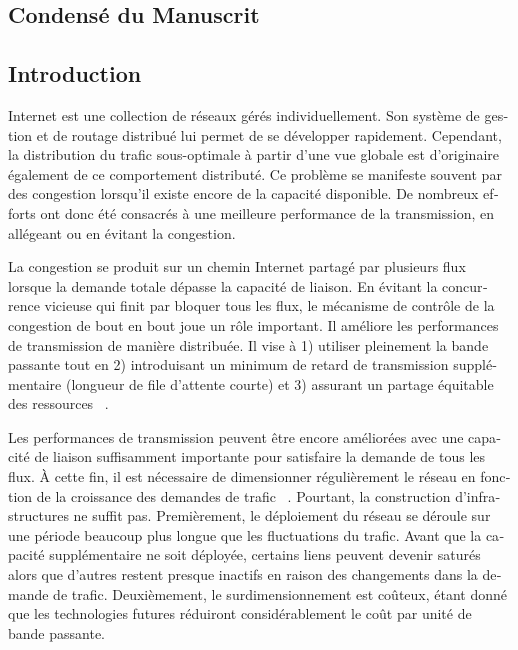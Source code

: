 \begin{otherlanguage}{french}
\chapter*{Condensé du Manuscrit}
\section*{Introduction}
Internet est une collection de réseaux gérés individuellement.
Son système de gestion et de routage distribué lui permet de se développer rapidement.
Cependant, la distribution du trafic sous-optimale à partir d'une vue globale est d'originaire également de ce comportement distributé.
Ce problème se manifeste souvent par des congestion lorsqu'il existe encore de la capacité disponible.
De nombreux efforts ont donc été consacrés à une meilleure performance de la transmission, en allégeant ou en évitant la congestion.

La congestion se produit sur un chemin Internet partagé par plusieurs flux lorsque la demande totale dépasse la capacité de liaison.
En évitant la concurrence vicieuse qui finit par bloquer tous les flux, le mécanisme de contrôle de la congestion de bout en bout joue un rôle important. Il améliore les performances de transmission de manière distribuée.
Il vise à 1) utiliser pleinement la bande passante tout en 2) introduisant un minimum de retard de transmission supplémentaire (longueur de file d'attente courte) et 3) assurant un partage équitable des ressources ~\cite{Jacobson1988, mathis1997macroscopic, Cardwell2016}.

Les performances de transmission peuvent être encore améliorées avec une capacité de liaison suffisamment importante pour satisfaire la demande de tous les flux. À cette fin, il est nécessaire de dimensionner régulièrement le réseau en fonction de la croissance des demandes de trafic ~\cite {pioro2004routing}.
Pourtant, la construction d'infrastructures ne suffit pas. Premièrement, le déploiement du réseau se déroule sur une période beaucoup plus longue que les fluctuations du trafic. Avant que la capacité supplémentaire ne soit déployée, certains liens peuvent devenir saturés alors que d'autres restent presque inactifs en raison des changements dans la demande de trafic. Deuxièmement, le surdimensionnement est coûteux, étant donné que les technologies futures réduiront considérablement le coût par unité de bande passante.


\end{otherlanguage}
